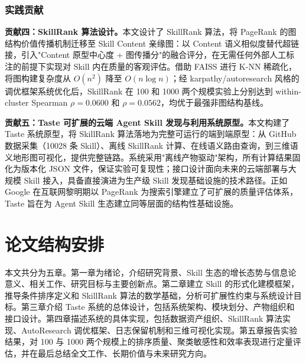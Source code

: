 \subsubsection*{实践贡献}

\textbf{贡献四：SkillRank 算法设计。}本文设计了 SkillRank 算法，将 PageRank 的图结构价值传播机制迁移至 Skill Content 亲缘图：以 Content 语义相似度替代超链接，引入"Content 原型中心度 + 图传播分"的融合评分，在无需任何外部人工标注的前提下实现对 Skill 内在质量的客观评估。借助 FAISS 进行 K-NN 稀疏化，将图构建复杂度从 $O(n^2)$ 降至 $O(n\log n)$；经 karpathy/autoresearch 风格的调优框架\cite{karpathy2025autoresearch}系统优化后，SkillRank 在 100 和 1000 两个规模实验上分别达到 within-cluster Spearman $\rho=0.0600$ 和 $\rho=0.0562$，均优于最强非图结构基线。

\textbf{贡献五：Taste 可扩展的云端 Agent Skill 发现与利用系统原型。}本文构建了 Taste 系统原型，将 SkillRank 算法落地为完整可运行的端到端原型：从 GitHub 数据采集（10028 条 Skill）、离线 SkillRank 计算、在线语义路由查询，到三维语义地形图可视化，提供完整链路。系统采用"离线产物驱动"架构，所有计算结果固化为版本化 JSON 文件，保证实验可复现性；接口设计面向未来的云端部署与大规模 Skill 接入，具备直接演进为生产级 Skill 发现基础设施的技术路径。正如 Google 在互联网黎明期以 PageRank 为搜索引擎建立了可扩展的质量评估体系，Taste 旨在为 Agent Skill 生态建立同等层面的结构性基础设施。

\section{论文结构安排}
\label{sec:arrangement}

本文共分为五章。第一章为绪论，介绍研究背景、Skill 生态的增长态势与信息论意义、相关工作、研究目标与主要创新点。第二章建立 Skill 的形式化建模框架，推导条件排序定义和 SkillRank 算法的数学基础，分析可扩展性约束与系统设计目标。第三章介绍 Taste 系统的总体设计，包括系统架构、模块划分、产物组织和接口设计。第四章描述系统的具体实现，包括数据资产组织、SkillRank 算法实现、AutoResearch 调优框架、日志保留机制和三维可视化实现。第五章报告实验结果，对 100 与 1000 两个规模上的排序质量、聚类敏感性和效率表现进行定量评估，并在最后总结全文工作、长期价值与未来研究方向。
